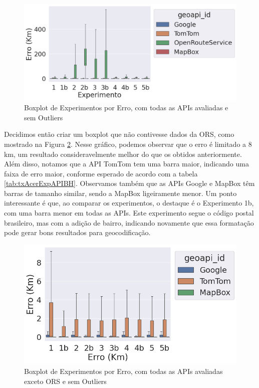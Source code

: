 \begin{figure}[h]
    \centering
    \includegraphics[width=\textwidth]{Figuras/boxplotExperimentoSemOut.png}
    \caption{Boxplot de Experimentos por Erro, com todas as APIs avaliadas e sem Outliers}
    \label{fig:boxplot-semout-bh}
\end{figure}


Decidimos então criar um boxplot que não contivesse dados da ORS, como mostrado na Figura \ref{fig:boxplot-semors-semout-bh}. Nesse gráfico, podemos observar que o erro é limitado a 8 km, um resultado consideravelmente melhor do que os obtidos anteriormente. Além disso, notamos que a API TomTom tem uma barra maior, indicando uma faixa de erro maior, conforme esperado de acordo com a tabela \ref{tab:txAcerExpAPIBH}. Observamos também que as APIs Google e MapBox têm barras de tamanho similar, sendo a MapBox ligeiramente menor. Um ponto interessante é que, ao comparar os experimentos, o destaque é o Experimento 1b, com uma barra menor em todas as APIs. Este experimento segue o código postal brasileiro, mas com a adição de bairro, indicando novamente que essa formatação pode gerar bons resultados para geocodificação.
  
\begin{figure}[h]
    \centering
    \includegraphics[width=\textwidth]{Figuras/boxplotExperimentoSemOutSemORS.png}
    \caption{Boxplot de Experimentos por Erro, com todas as APIs avaliadas exceto ORS e sem Outliers}
    \label{fig:boxplot-semors-semout-bh}
\end{figure}

